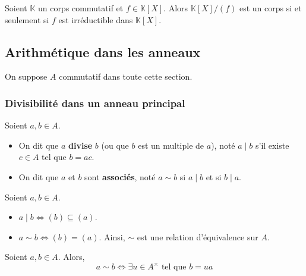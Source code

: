   \begin{corollary}
    Soient $\mathbb{K}$ un corps commutatif et $f \in \mathbb{K}[X]$. Alors $\mathbb{K}[X]/(f)$ est un corps si et seulement si $f$ est irréductible dans $\mathbb{K}[X]$.
  \end{corollary}

  \subsection{Arithmétique dans les anneaux}

  On suppose $A$ commutatif dans toute cette section.

  \subsubsection{Divisibilité dans un anneau principal}


  \begin{definition}
    Soient $a, b \in A$.
    \begin{itemize}
      \item On dit que $a$ \textbf{divise} $b$ (ou que $b$ est un multiple de $a$), noté $a \mid b$ s'il existe $c \in A$ tel que $b = ac$.
      \item On dit que $a$ et $b$ sont \textbf{associés}, noté $a \sim b$ si $a \mid b$ et si $b \mid a$.
    \end{itemize}
  \end{definition}

  \begin{remark}
    Soient $a, b \in A$.
    \begin{itemize}
      \item $a \mid b \iff (b) \subseteq (a)$.
      \item $a \sim b \iff (b) = (a)$. Ainsi, $\sim$ est une relation d'équivalence sur $A$.
    \end{itemize}
  \end{remark}

  \begin{proposition}
    Soient $a, b \in A$. Alors,
    \[ a \sim b \iff \exists u \in A^\times \text{ tel que } b = ua \]
  \end{proposition}

